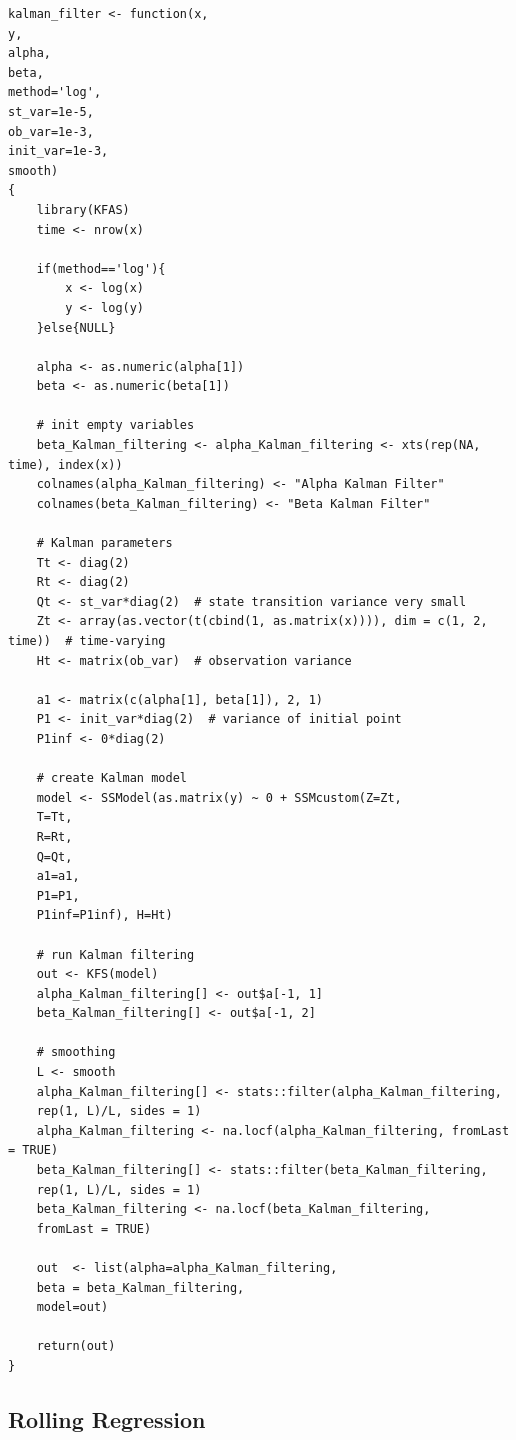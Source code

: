 \documentclass[]{article}
\begin{document}
\begin{lstlisting}
kalman_filter <- function(x,
y,
alpha,
beta,
method='log',
st_var=1e-5,
ob_var=1e-3,
init_var=1e-3,
smooth)
{
	library(KFAS)
	time <- nrow(x)
	
	if(method=='log'){
		x <- log(x)
		y <- log(y)
	}else{NULL}
	
	alpha <- as.numeric(alpha[1])
	beta <- as.numeric(beta[1])
	
	# init empty variables
	beta_Kalman_filtering <- alpha_Kalman_filtering <- xts(rep(NA, time), index(x))
	colnames(alpha_Kalman_filtering) <- "Alpha Kalman Filter"
	colnames(beta_Kalman_filtering) <- "Beta Kalman Filter"
	
	# Kalman parameters
	Tt <- diag(2)
	Rt <- diag(2)
	Qt <- st_var*diag(2)  # state transition variance very small
	Zt <- array(as.vector(t(cbind(1, as.matrix(x)))), dim = c(1, 2, time))  # time-varying
	Ht <- matrix(ob_var)  # observation variance
	
	a1 <- matrix(c(alpha[1], beta[1]), 2, 1) 
	P1 <- init_var*diag(2)  # variance of initial point
	P1inf <- 0*diag(2)
	
	# create Kalman model
	model <- SSModel(as.matrix(y) ~ 0 + SSMcustom(Z=Zt, 
	T=Tt, 
	R=Rt, 
	Q=Qt, 
	a1=a1, 
	P1=P1, 
	P1inf=P1inf), H=Ht)
	
	# run Kalman filtering
	out <- KFS(model)
	alpha_Kalman_filtering[] <- out$a[-1, 1]  
	beta_Kalman_filtering[] <- out$a[-1, 2]
	
	# smoothing
	L <- smooth
	alpha_Kalman_filtering[] <- stats::filter(alpha_Kalman_filtering,
	rep(1, L)/L, sides = 1)
	alpha_Kalman_filtering <- na.locf(alpha_Kalman_filtering, fromLast = TRUE)
	beta_Kalman_filtering[] <- stats::filter(beta_Kalman_filtering, 
	rep(1, L)/L, sides = 1)
	beta_Kalman_filtering <- na.locf(beta_Kalman_filtering,
	fromLast = TRUE)
	
	out  <- list(alpha=alpha_Kalman_filtering,
	beta = beta_Kalman_filtering,
	model=out)
	
	return(out)
}
\end{lstlisting}


\subsection*{Rolling Regression}
\end{document}
